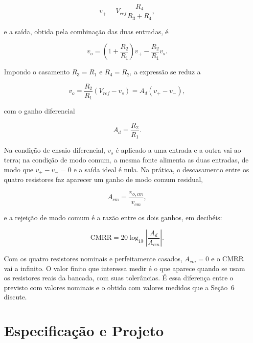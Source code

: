 \documentclass[11pt,a4paper]{article}
\begin{document}
\begin{equation}
v_+ = V_{ref} \frac{R_4}{R_3 + R_4} ,
\label{eq:dif_vplus}
\end{equation}

e a saída, obtida pela combinação das duas entradas, é

\begin{equation}
v_o = \left( 1 + \frac{R_2}{R_1} \right) v_+ - \frac{R_2}{R_1} v_s .
\label{eq:dif_saida_geral}
\end{equation}

Impondo o casamento $R_3 = R_1$ e $R_4 = R_2$, a expressão se reduz a

\begin{equation}
v_o = \frac{R_2}{R_1} (V_{ref} - v_s) = A_d (v_+ - v_-) ,
\label{eq:dif_saida}
\end{equation}

com o ganho diferencial

\begin{equation}
A_d = \frac{R_2}{R_1} .
\label{eq:dif_ganho}
\end{equation}

Na condição de ensaio diferencial, $v_s$ é aplicado a uma entrada e a outra vai ao terra; na condição de modo comum, a mesma fonte alimenta as duas entradas, de modo que $v_+ - v_- = 0$ e a saída ideal é nula. Na prática, o descasamento entre os quatro resistores faz aparecer um ganho de modo comum residual,

\begin{equation}
A_{cm} = \frac{v_{o,cm}}{v_{cm}} ,
\label{eq:acm}
\end{equation}

e a rejeição de modo comum é a razão entre os dois ganhos, em decibéis:

\begin{equation}
\text{CMRR} = 20 \log_{10} \left| \frac{A_d}{A_{cm}} \right| .
\label{eq:cmrr}
\end{equation}

Com os quatro resistores nominais e perfeitamente casados, $A_{cm} = 0$ e o CMRR vai a infinito. O valor finito que interessa medir é o que aparece quando se usam os resistores reais da bancada, com suas tolerâncias. É essa diferença entre o previsto com valores nominais e o obtido com valores medidos que a Seção~6 discute.

\section{Especificação e Projeto}
\end{document}
